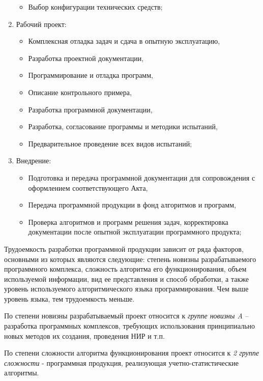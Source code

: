 \begin{enumerate}
\begin{itemize}
                \item Выбор конфигурации технических средств;
            \end{itemize}
        \item Рабочий проект:
            \begin{itemize}
                \item Комплексная отладка задач и сдача в опытную эксплуатацию,
                \item Разработка проектной документации,
                \item Программирование и отладка программ,
                \item Описание контрольного примера,
                \item Разработка программной документации,
                \item Разработка, согласование программы и методики испытаний,
                \item Предварительное проведение всех видов испытаний;
            \end{itemize}
        \item Внедрение:
            \begin{itemize}
                \item Подготовка и передача программной документации для сопровождения с оформлением соответствующего Акта,
                \item Передача программной продукции в фонд алгоритмов и программ,
                \item Проверка алгоритмов и программ решения задач, корректировка документации после опытной эксплуатации программного продукта;
            \end{itemize}
    \end{enumerate}

    Трудоемкость разработки программной продукции зависит от ряда факторов, основными из которых являются следующие: степень новизны разрабатываемого программного комплекса, сложность алгоритма его функционирования, объем используемой информации, вид ее представления и способ обработки, а также уровень используемого алгоритмического языка программирования.
    Чем выше уровень языка, тем трудоемкость меньше.

    По степени новизны разрабатываемый проект относится к \textit{группе новизны A} – разработка программных комплексов, требующих использования принципиально новых методов их создания, проведения НИР и т.п.

    По степени сложности алгоритма функционирования проект относится к \textit{2 группе сложности} - программная продукция, реализующая учетно-статистические алгоритмы.

